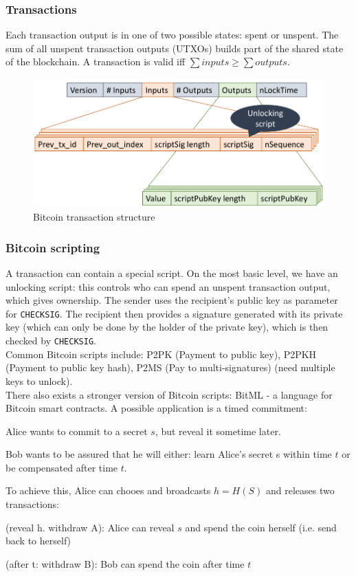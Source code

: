 \documentclass[11pt,oneside,a4paper]{article}
\begin{document}
\subsubsection{Transactions}

Each transaction output is in one of two possible states: spent or unspent. The sum of all unspent transaction outputs (UTXOs) builds part of the shared state of the blockchain. A transaction is valid iff $\sum inputs \geq \sum outputs$.

\begin{figure}
	\centering
	\includegraphics[width=0.4\linewidth]{figures/bitcoin_transaction_structure}
	\caption{Bitcoin transaction structure}
	\label{fig:bitcointransactionstructure}
\end{figure}

\subsubsection{Bitcoin scripting}

A transaction can contain a special script. 
On the most basic level, we have an unlocking script: this controls who can spend an unspent transaction output, which gives ownership. The sender uses the recipient's public key as parameter for \texttt{CHECKSIG}. The recipient then provides a signature generated with its private key (which can only be done by the holder of the private key), which is then checked by \texttt{CHECKSIG}.\\
Common Bitcoin scripts include: P2PK (Payment to public key), P2PKH (Payment to public key hash), P2MS (Pay to multi-signatures) (need multiple keys to unlock).\\

There also exists a stronger version of Bitcoin scripts: BitML - a language for Bitcoin smart
contracts. A possible application is a timed commitment:

\begin{compactitem}
	\item Alice wants to commit to a secret $s$, but reveal it sometime later.
	\item Bob wants to be assured that he will either: learn Alice's secret s within time $t$ or be compensated after time $t$.
	\item To achieve this, Alice can chooes and broadcasts $h = H(S)$ and releases two transactions:
	\begin{compactitem}
		\item (reveal h. withdraw A): Alice can reveal $s$ and spend the coin herself (i.e. send back to herself)
		\item (after t: withdraw B): Bob can spend the coin after time $t$
	\end{compactitem}
\end{compactitem}
\end{document}
